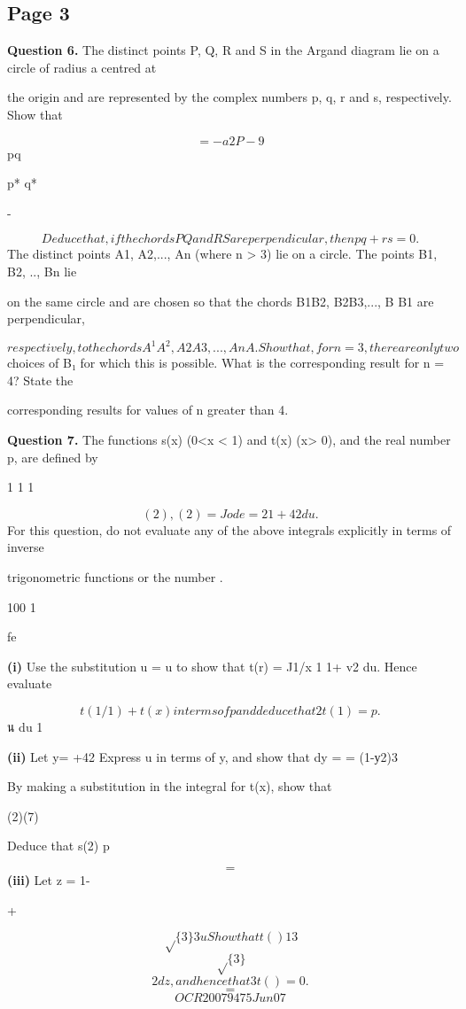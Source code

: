 \documentclass[12pt]{article}
\begin{document}
\subsection*{Page 3}
\begin{flushleft}
\bigskip\textbf{Question 6.} The distinct points P, Q, R and S in the Argand diagram lie on a circle of radius a centred at\par
the origin and are represented by the complex numbers p, q, r and s, respectively. Show that\par
\[=-a2P-9\]
pq\par
p* q*\par
-\par
\[Deduce that, if the chords PQ and RS are perpendicular, then pq + rs = 0.\]
The distinct points A1, A2,..., An (where n > 3) lie on a circle. The points B1, B2, .., Bn lie\par
on the same circle and are chosen so that the chords B1B2, B2B3,..., B B1 are perpendicular,\par
\[respectively, to the chords A^1 A^2, A2A3,..., AnA. Show that, for n = 3, there are only two\]
choices of B₁ for which this is possible. What is the corresponding result for n = 4? State the\par
corresponding results for values of n greater than 4.\par
\bigskip\textbf{Question 7.} The functions s(x) (0<x < 1) and t(x) (x> 0), and the real number p, are defined by\par
1 1 1\par
\[(2), (2) = Jo de =2 1+42 du.\]
For this question, do not evaluate any of the above integrals explicitly in terms of inverse\par
trigonometric functions or the number .\par
100 1\par
fe\par
\textbf{(i)} Use the substitution u = u to show that t(r) = J1/x 1 1+ v2 du. Hence evaluate\par
\[t(1/1) + t(x) in terms of p and deduce that 2t(1) = p.\]
น du 1\par
\textbf{(ii)} Let y= +42 Express u in terms of y, and show that dy = = \sqrt(1-у2)3\par
By making a substitution in the integral for t(x), show that\par
(2)(7)\par
Deduce that s(2) p\par
\[=\]
\textbf{(iii)} Let z = 1-\par
+\par
\[\sqrt\{3\} 3 u Show that t() 13\]
\[\sqrt\{3\}\]
\[2 dz, and hence that 3t() = 0.\]
\[=\]
\[OCR 2007 9475 Jun07\]
\end{flushleft}
\end{document}
